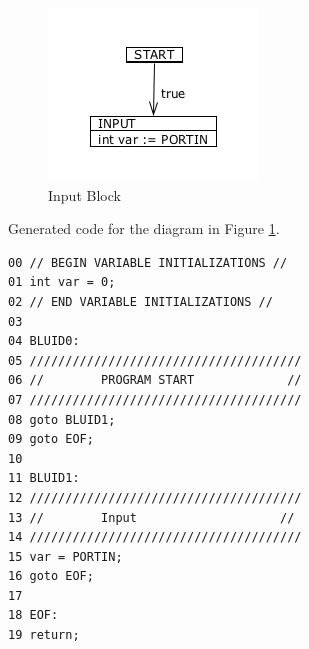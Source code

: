 \begin{figure}[h]
	\centering
	\includegraphics[width=\imgmedsmall]{./images/correctness_ex_input.png}
	\caption{Input Block}
	\label{fig:correctness_ex_input}
\end{figure}

Generated  code for the diagram in Figure \ref{fig:correctness_ex_input}.
\begin{lstlisting}[frame=single]
00 // BEGIN VARIABLE INITIALIZATIONS //
01 int var = 0;
02 // END VARIABLE INITIALIZATIONS //
03 
04 BLUID0:
05 //////////////////////////////////////
06 //        PROGRAM START             //
07 //////////////////////////////////////
08 goto BLUID1;
09 goto EOF;
10
11 BLUID1:
12 //////////////////////////////////////
13 //        Input                    //
14 //////////////////////////////////////
15 var = PORTIN;
16 goto EOF;
17
18 EOF:
19 return;
\end{lstlisting}

